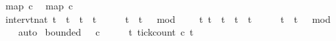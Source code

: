 \begin{isabellebody}
\isamarkupfalse%
\ {\isacartoucheopen}map\ c{}\ {\isacharbrackleft}{}{\isacharcomma}{}{\isacharcomma}{}{\isacharcomma}{}{\isacharcomma}{}{\isacharcomma}{}{\isacharcomma}{}{\isacharcomma}{}{\isacharcomma}{}{\isacharcomma}{}{\isacharcomma}{}{}{\isacharbrackright}{\isacartoucheclose}\isanewline
{}\isamarkupfalse%
\ {\isacartoucheopen}map\ c{}\ {\isacharbrackleft}{}{\isacharcomma}{}{\isacharcomma}{}{\isacharcomma}{}{\isacharcomma}{}{\isacharcomma}{}{\isacharcomma}{}{\isacharcomma}{}{\isacharcomma}{}{\isacharcomma}{}{\isacharcomma}{}{}{\isacharbrackright}{\isacartoucheclose}\isanewline
\isanewline
{}\isamarkupfalse%
\ interv{\isacharunderscore}{}{\isacharcolon}{\isacartoucheopen}{\isacharbraceleft}t{\isacharcolon}{\isacharcolon}nat{\isachardot}\ t\ {\isasymle}\ t\ {\isasymand}\ t\ {\isacharless}\ t\ {\isacharplus}\ {}\ {\isasymand}\ {}\ {\isasymle}\ t\ {\isasymand}\ {\isacharparenleft}t\ {\isacharminus}\ {}{\isacharparenright}\ mod\ {}\ {\isacharequal}\ {}{\isacharbraceright}\ {\isacharequal}\ {\isacharbraceleft}t{\isachardot}\ {\isacharparenleft}t\ {\isacharequal}\ t\ {\isasymor}\ t\ {\isacharequal}\ t\ {\isacharplus}\ {}{\isacharparenright}\ {\isasymand}\ {}\ {\isasymle}\ t\ {\isasymand}\ {\isacharparenleft}t\ {\isacharminus}\ {}{\isacharparenright}\ mod\ {}\ {\isacharequal}\ {}{\isacharbraceright}{\isacartoucheclose}\isanewline
%
\isadelimproof
\ \ %
\endisadelimproof
%
\isatagproof
{}\isamarkupfalse%
\ auto%
\endisatagproof
{\isafoldproof}%
%
\isadelimproof
\isanewline
%
\endisadelimproof
\isanewline
{}\isamarkupfalse%
\ {\isacartoucheopen}bounded\ {}\ {}\ c{}{\isacartoucheclose}\isanewline
%
\isadelimproof
%
\endisadelimproof
%
\isatagproof
{}\isamarkupfalse%
\ {\isacharminus}\isanewline
\ \ \isamarkupfalse%
\ {\isacartoucheopen}{\isasymforall}t{\isachardot}\ tick{\isacharunderscore}count\ c{}\ t\ {}\ {\isasymle}\ {}{\isacartoucheclose}\isanewline

\end{isabellebody}
